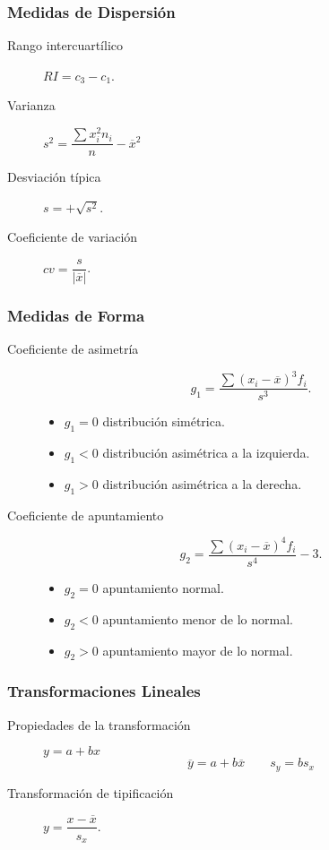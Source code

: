 \documentclass[a4paper]{article}
\newlength{\mylength}
\newenvironment{marco}{
	\setlength{\fboxsep}{5pt}
	\setlength{\mylength}{\textwidth}
	\addtolength{\mylength}{-2\fboxsep}
	\addtolength{\mylength}{-2\fboxrule}
	\noindent
	\begin{Sbox}
	\begin{minipage}{\mylength}
	\setlength{\abovedisplayskip}{3pt}
	\setlength{\belowdisplayskip}{3pt}
}
{
	\end{minipage}
	\end{Sbox}
	\fbox{\TheSbox}
}
\begin{document}
\begin{marco}
\begin{multicols}{2}
\subsubsection*{Medidas de Dispersión}
\begin{description}
\item [Rango intercuartílico] $RI=c_3-c_1$.
\item [Varianza] $s^2=\dfrac{\sum x_i^2n_i}{n}-\overline{x}^2$
\item [Desviación típica] $s=+\sqrt{s^2}$.
\item [Coeficiente de variación] $cv=\dfrac{s}{|\overline{x}|}$.
\end{description}
\subsubsection*{Medidas de Forma}
\begin{description}
\item [Coeficiente de asimetría] \[g_1=\frac{\sum
(x_i-\overline{x})^3f_i}{s^3}.\]
\begin{itemize}
\item $g_1=0$ distribución simétrica.
\item $g_1<0$ distribución asimétrica a la izquierda.
\item $g_1>0$ distribución asimétrica a la derecha.
\end{itemize}
\item [Coeficiente de apuntamiento] \[g_2=\frac{\sum
(x_i-\overline{x})^4f_i}{s^4}-3.\]
\begin{itemize}
\item $g_2=0$ apuntamiento normal.
\item $g_2<0$ apuntamiento menor de lo normal.
\item $g_2>0$ apuntamiento mayor de lo normal.
\end{itemize}
\end{description}

\subsubsection*{Transformaciones Lineales}
\begin{description}
\item [Propiedades de la transformación]\mbox{$y=a+bx$}
\[\overline{y}=a+b\overline{x} \qquad s_y=bs_x\]

\item [Transformación de tipificación] $y=\dfrac{x-\overline{x}}{s_x}$.
\end{description}
\end{multicols}
\end{marco}
\end{document}
